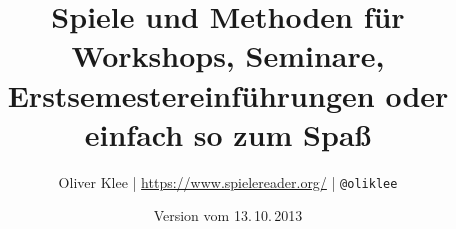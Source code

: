\documentclass[a4paper,twoside,11pt,titlepage,openany]{scrbook}
\author{\raggedright Oliver Klee | \url{https://www.spielereader.org/} | \texttt{@oliklee}}
\title{Spiele und Methoden für Workshops, Seminare, Erstsemestereinführungen oder einfach so zum Spaß}
\date{Version vom 13.\,10.\,2013}
\begin{document}
\nocite*{}

\frontmatter
\maketitle
\tableofcontents

\mainmatter











\backmatter


\appendix


\printindex
\end{document}
